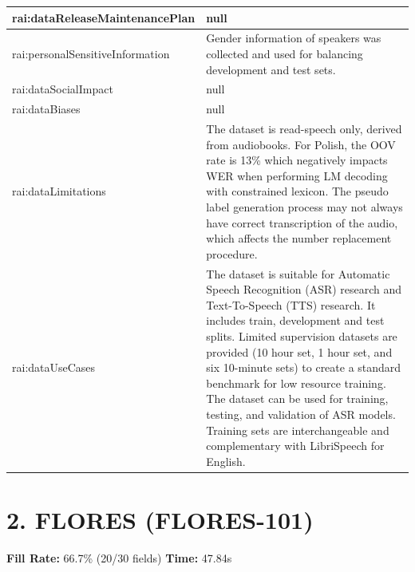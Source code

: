\documentclass[10pt,a4paper]{article}
\begin{document}
\begin{longtable}{|p{4cm}|p{12cm}|}
\hline
rai:dataReleaseMaintenancePlan & null \\
\hline
rai:personalSensitiveInformation & Gender information of speakers was collected and used for balancing development and test sets. \\
\hline
rai:dataSocialImpact & null \\
\hline
rai:dataBiases & null \\
\hline
rai:dataLimitations & The dataset is read-speech only, derived from audiobooks. For Polish, the OOV rate is 13\% which negatively impacts WER when performing LM decoding with constrained lexicon. The pseudo label generation process may not always have correct transcription of the audio, which affects the number replacement procedure. \\
\hline
rai:dataUseCases & The dataset is suitable for Automatic Speech Recognition (ASR) research and Text-To-Speech (TTS) research. It includes train, development and test splits. Limited supervision datasets are provided (10 hour set, 1 hour set, and six 10-minute sets) to create a standard benchmark for low resource training. The dataset can be used for training, testing, and validation of ASR models. Training sets are interchangeable and complementary with LibriSpeech for English. \\
\hline
\end{longtable}

\newpage

\section*{2. FLORES (FLORES-101)}
\textbf{Fill Rate:} 66.7\% (20/30 fields) \quad \textbf{Time:} 47.84s
\end{document}
